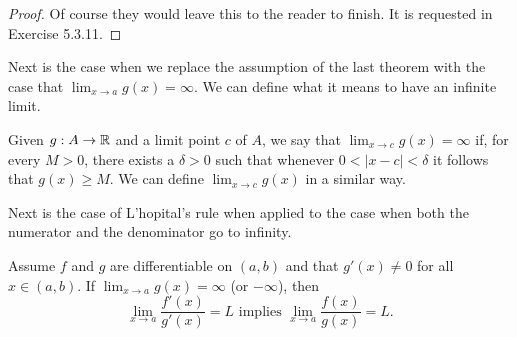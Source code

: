 \begin{proof}
Of course they would leave this to the reader to finish. It is requested in Exercise 5.3.11.
\end{proof}

Next is the case when we replace the assumption of the last theorem with the case that \( \lim_{ x \to a } g(x) = \infty \). We can define what it means to have an infinite limit.

\begin{definition}
Given \( g: A \to \mathbb{R} \) and a limit point \( c  \) of \( A  \), we say that \( \lim_{ x \to c  } g(x) = \infty  \) if, for every \( M > 0  \), there exists a \( \delta > 0  \) such that whenever \( 0 < | x -c  |  < \delta  \) it follows that \( g(x) \geq M  \). We can define \( \lim_{ x \to c  } g(x)  \) in a similar way.
\end{definition}
 Next is the case of L'hopital's rule when applied to the case when both the numerator and the denominator go to infinity.
 \begin{theorem}
    Assume \( f  \) and \( g  \) are differentiable on \( (a,b)  \) and that \( g'(x) \neq 0  \) for all \( x \in (a,b) \). If \( \lim_{ x \to a } g(x) = \infty  \) (or \( - \infty  \)), then 
    \[  \lim_{ x \to a } \frac{ f'(x)  }{ g'(x)  } = L \text{~implies~} \lim_{ x \to a } \frac{ f(x)  }{ g(x)  } = L. \]
    \end{theorem}

